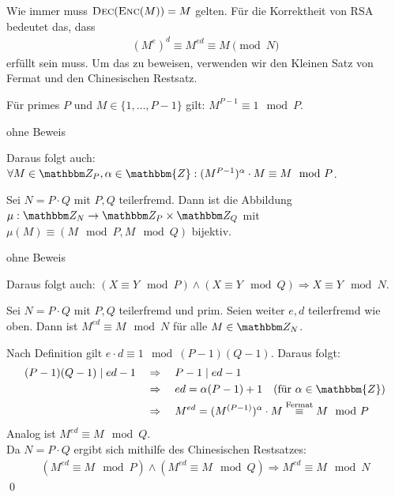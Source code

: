 Wie immer muss $\textsc{Dec}(\textsc{Enc}(M)) = M$ gelten. Für die Korrektheit von RSA bedeutet das, dass
\begin{align*}
	(M^e)^d \equiv M^{ed} \equiv M \pmod N
\end{align*}
erfüllt sein muss. Um das zu beweisen, verwenden wir den Kleinen Satz von Fermat und den Chinesischen Restsatz.
\begin{theorem}
Für primes $P$ und $M \in \{1, \dotsc, P-1\}$ gilt: $M^{P-1} \equiv 1 \mod P$.
\end{theorem}
\begin{beweis}
  ohne Beweis
\end{beweis}
Daraus folgt auch: $\forall M \in \Z P, \alpha \in \mathbbm{Z} : (M^{P-1})^{\alpha} \cdot M \equiv M \mod P$.

\begin{theorem}
Sei $N = P \cdot Q$ mit $P, Q$ teilerfremd. Dann ist die Abbildung $\mu : \Z N \rightarrow \Z P \times \Z Q$ mit $\mu(M) \equiv (M \mod P, M \mod Q)$ bijektiv.
\end{theorem}
\begin{beweis}
  ohne Beweis
\end{beweis}
Daraus folgt auch: $(X \equiv Y \mod P) \land (X \equiv Y \mod Q) \Rightarrow X \equiv Y \mod N$.

\begin{theorem}
Sei $N = P \cdot Q$ mit $P, Q$ teilerfremd und prim. Seien weiter $e, d$ teilerfremd wie oben. Dann ist $M^{ed} \equiv M \mod N$ für alle $M \in \Z N$.
\end{theorem}

\begin{beweis}
Nach Definition gilt $e \cdot d \equiv 1 \mod (P-1)(Q-1)$. Daraus folgt:
\begin{align*}
(P-1)(Q-1) \mid ed - 1 \quad
& \Rightarrow \quad P-1 \mid ed - 1\\
& \Rightarrow \quad ed = \alpha (P-1) + 1 \quad (\text{für } \alpha \in \mathbbm{Z})\\
& \Rightarrow \quad M^{ed} = (M^{(P-1)})^{\alpha} \cdot M \stackrel{\text{Fermat}}\equiv M \mod P
\end{align*}
Analog ist $M^{ed} \equiv M \mod Q$.\\
Da $N = P \cdot Q$ ergibt sich mithilfe des Chinesischen Restsatzes:
\begin{align*}
(M^{ed} \equiv M \mod P) \land (M^{ed} \equiv M \mod Q) \Rightarrow M^{ed} \equiv M \mod N
\end{align*}
\qed
\end{beweis}


